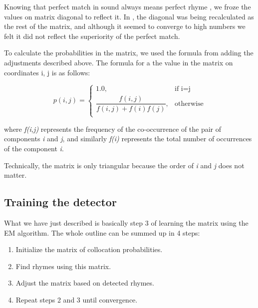 Knowing that perfect match in sound always means perfect rhyme , we froze the values on matrix diagonal to reflect it. In \cite{plechavc2018collocation}, the diagonal was being recalculated as the rest of the matrix, and although it seemed to converge to high numbers we felt it did not reflect the superiority of the perfect match.

To calculate the probabilities in the matrix, we used the formula from \cite{plechavc2018collocation} adding the adjustments described above. The formula for a the value in the matrix on coordinates i, j is as follows: 


	    \[ p(i,j) = \begin{cases} 
	    \mbox{1.0,} & \mbox{if  i=j} \\ 
	  \dfrac{f(i,j)}{f(i,j) + f(i)f(j)},
	     & \mbox{otherwise} \\
	    \end{cases} \]

where\textit{ f(i,j)} represents the frequency of the co-occurrence of the pair of components \textit{i} and \textit{j}, and similarly \textit{f(i)} represents the total number of occurrences of the component \textit{i}.

Technically, the matrix is only triangular because the order of \textit{i} and \textit{j} does not matter.

\subsection{Training the detector} \label{analysis:training}
What we have just described is basically step 3 of learning the matrix using the EM algorithm. The whole outline can be summed up in 4 steps:
\begin{enumerate}
	\item Initialize the matrix of collocation probabilities.
	\item Find rhymes using this matrix.
	\item Adjust the matrix based on detected rhymes.
	\item Repeat steps 2 and 3 until convergence.
\end{enumerate} 

